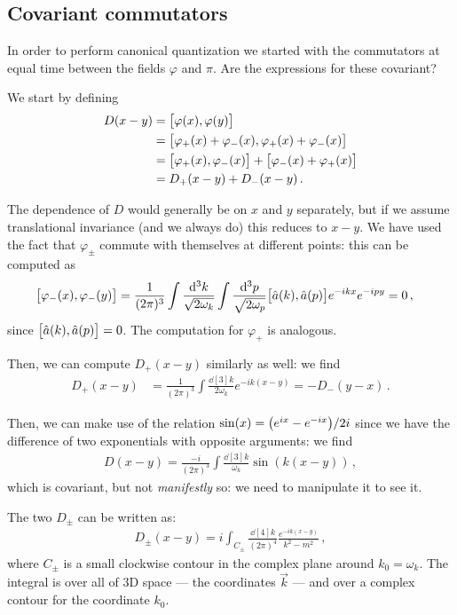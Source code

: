 \documentclass[main.tex]{subfiles}
\begin{document}
\subsection{Covariant commutators}

In order to perform canonical quantization we started with the commutators at equal time between the fields \(\varphi \) and \(\pi \). 
Are the expressions for these covariant? 

We start by defining 
%
\begin{align}
D(x - y) &= \qty[\varphi (x), \varphi (y)]  \\
&= \qty[\varphi_{+} (x) + \varphi_{-} (x), \varphi_{+} (x) + \varphi_{-} (x)]  \\
&= \qty[\varphi_{+} (x), \varphi_{-} (x)] + \qty[\varphi_{-} (x) + \varphi_{+} (x)]  \\
&= D_+ (x-y) + D_- (x-y)
\,.
\end{align}

The dependence of \(D\) would generally be on \(x\) and \(y\) separately, but if we assume translational invariance (and we always do) this reduces to \(x-y\).
We have used the fact that \(\varphi_{\pm}\) commute with themselves at different points: this can be computed as 
%
\begin{align}
\qty[\varphi_{-}(x) , \varphi_{-}(y)] &=
\frac{1}{(2\pi )^{3}} \int \frac{ \dd[3]{k}}{\sqrt{2 \omega_{k}}}
\int \frac{\dd[3]{p}}{\sqrt{2 \omega_{p}}} 
\qty[\hat{a}(k), \hat{a}(p)] e^{-ikx} e^{-ipy} = 0
\,,
\end{align}
%
since \(\qty[\hat{a}(k), \hat{a}(p)] = 0\). The computation for \(\varphi_{+}\) is analogous. 

Then, we can compute \(D_{+} (x-y)\) similarly as well: we find 
%
\begin{align}
D_{+} (x-y) &= \frac{1}{(2\pi )^3} \int \frac{ \dd[3]{k} }{2 \omega_{k}}
e^{-ik(x-y)} = - D_{-} (y-x)  
\,.
\end{align}

Then, we can make use of the relation \(\sin(x) = \qty(e^{ix} - e^{-ix}) / 2i\) since we have the difference of two exponentials with opposite arguments: we find 
%
\begin{align}
D(x-y) = \frac{-i}{(2 \pi )^3}
\int \frac{ \dd[3]{k}}{\omega_{k}} \sin(k (x-y))
\,,
\end{align}
%
which is covariant, but not \emph{manifestly} so: we need to manipulate it to see it.

\begin{claim}
The two \(D_{\pm } \) can be written as: 
%
\begin{align}
    D_{\pm } (x-y) = i \int_{C_{\pm}} \frac{ \dd[4]{k}}{(2 \pi )^{4}} \frac{e^{-ik(x-y)}}{k^2- m^2}
    \,,
\end{align}
%
where \(C_{\pm}\) is a small clockwise contour in the complex plane around \(k_0 = \omega_{k}\). The integral is over all of 3D space --- the coordinates \(\vec{k}\) --- and over a complex contour for the coordinate \(k_0 \). 
\end{claim}
\end{document}
